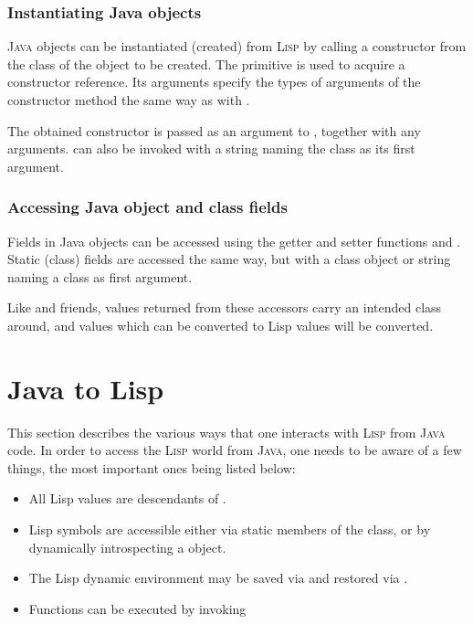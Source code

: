 \documentclass[10pt]{book}
\begin{document}

\subsubsection{Instantiating Java objects}

\textsc{Java} objects can be instantiated (created) from \textsc{Lisp} by calling
a constructor from the class of the object to be created. The
 primitive is used to acquire a constructor
reference. Its arguments specify the types of arguments of the constructor
method the same way as with .

The obtained constructor is passed as an argument to ,
together with any arguments.   can also be invoked with
a string naming the class as its first argument.

\subsubsection{Accessing Java object and class fields}

Fields in Java objects can be accessed using the getter and setter
functions  and .  Static
(class) fields are accessed the same way, but with a class object or
string naming a class as first argument.

Like  and friends, values returned from these accessors carry
an intended class around, and values which can be converted to Lisp values will
be converted.

\section{Java to Lisp}

This section describes the various ways that one interacts with \textsc{Lisp}
from \textsc{Java} code.  In order to access the \textsc{Lisp} world from \textsc{Java}, one needs
to be aware of a few things, the most important ones being listed below:

\begin{itemize}
\item All Lisp values are descendants of .
\item Lisp symbols are accessible either via static members of the
   class, or by dynamically introspecting a 
  object.
\item The Lisp dynamic environment may be saved via
   and restored via
  .
\item Functions can be executed by invoking 
\end{itemize}
\end{document}

